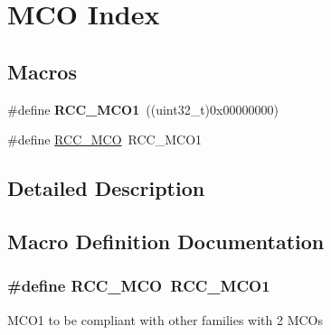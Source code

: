 \hypertarget{group___r_c_c___m_c_o___index}{\section{M\-C\-O Index}
\label{group___r_c_c___m_c_o___index}
}
\subsection*{Macros}
\begin{DoxyCompactItemize}
\item 
\hypertarget{group___r_c_c___m_c_o___index_ga152dd1ae9455e528526c4e23a817937b}{\#define {\bfseries R\-C\-C\-\_\-\-M\-C\-O1}~((uint32\-\_\-t)0x00000000)}\label{group___r_c_c___m_c_o___index_ga152dd1ae9455e528526c4e23a817937b}

\item 
\#define \hyperlink{group___r_c_c___m_c_o___index_gad9bc2abe13f0d3e62a5f9aa381927eb3}{R\-C\-C\-\_\-\-M\-C\-O}~R\-C\-C\-\_\-\-M\-C\-O1
\end{DoxyCompactItemize}


\subsection{Detailed Description}


\subsection{Macro Definition Documentation}
\hypertarget{group___r_c_c___m_c_o___index_gad9bc2abe13f0d3e62a5f9aa381927eb3}{
\subsubsection[{R\-C\-C\-\_\-\-M\-C\-O}]{\setlength{\rightskip}{0pt plus 5cm}\#define R\-C\-C\-\_\-\-M\-C\-O~R\-C\-C\-\_\-\-M\-C\-O1}}\label{group___r_c_c___m_c_o___index_gad9bc2abe13f0d3e62a5f9aa381927eb3}
M\-C\-O1 to be compliant with other families with 2 M\-C\-Os 